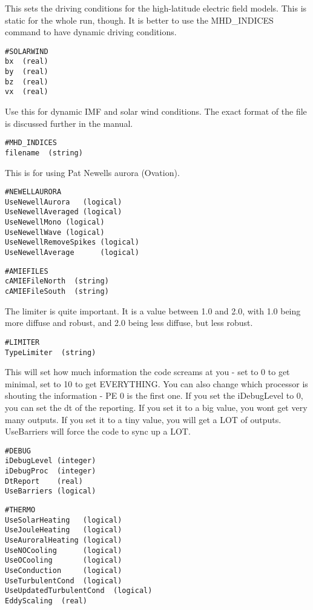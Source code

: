 This sets the driving conditions for the high-latitude
electric field models.  This is static for the whole
run, though.  It is better to use the MHD\_INDICES
command to have dynamic driving conditions.
\begin{verbatim}
#SOLARWIND
bx  (real)
by  (real)
bz  (real)
vx  (real)
\end{verbatim}

Use this for dynamic IMF and solar wind conditions.
The exact format of the file is discussed further
in the manual.
\begin{verbatim}
#MHD_INDICES
filename  (string)
\end{verbatim}

This is for using Pat Newells aurora (Ovation).
\begin{verbatim}
#NEWELLAURORA
UseNewellAurora   (logical)
UseNewellAveraged (logical)
UseNewellMono (logical)
UseNewellWave (logical)
UseNewellRemoveSpikes (logical)
UseNewellAverage      (logical)
\end{verbatim}

\begin{verbatim}
#AMIEFILES
cAMIEFileNorth  (string)
cAMIEFileSouth  (string)
\end{verbatim}

The limiter is quite important.  It is a value
between 1.0 and 2.0, with 1.0 being more diffuse and
robust, and 2.0 being less diffuse, but less robust.
\begin{verbatim}
#LIMITER
TypeLimiter  (string)
\end{verbatim}

This will set how much information the code screams
at you - set to 0 to get minimal, set to 10 to get
EVERYTHING.  You can also change which processor is
shouting the information - PE 0 is the first one.
If you set the iDebugLevel to 0, you can set the dt
of the reporting.  If you set it to a big value,
you wont get very many outputs.  If you set it to a
tiny value, you will get a LOT of outputs.
UseBarriers will force the code to sync up a LOT.
\begin{verbatim}
#DEBUG
iDebugLevel (integer)
iDebugProc  (integer)
DtReport    (real)
UseBarriers (logical)
\end{verbatim}

\begin{verbatim}
#THERMO
UseSolarHeating   (logical)
UseJouleHeating   (logical)
UseAuroralHeating (logical)
UseNOCooling      (logical)
UseOCooling       (logical)
UseConduction     (logical)
UseTurbulentCond  (logical)
UseUpdatedTurbulentCond  (logical)
EddyScaling  (real)
\end{verbatim}

